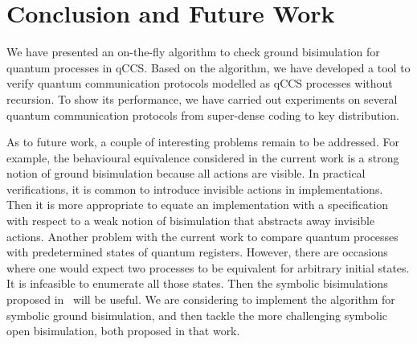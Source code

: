 \documentclass[a4paper,UKenglish,cleveref, autoref]{lipics-v2019}
\begin{document}
\section{Conclusion and Future Work}\label{sec:con}
We have presented an on-the-fly algorithm to check ground bisimulation for quantum processes in qCCS. Based on the algorithm, we have developed a tool to verify quantum communication protocols modelled as qCCS processes without recursion.  To show its performance, we have carried out experiments on several quantum communication protocols from super-dense coding to key distribution.

As to future work, a couple of interesting problems remain to be addressed.
For example, the behavioural equivalence considered in the current work is a strong notion of ground bisimulation because all actions are visible. In practical verifications, it is common to introduce invisible actions in implementations. Then it is more appropriate to equate an implementation with a specification with respect to a weak notion of bisimulation that abstracts away invisible actions. Another problem with the current work to compare quantum processes with predetermined states of quantum registers. However, there are occasions where one would expect two processes to be equivalent for arbitrary initial states. It is infeasible to enumerate all those states. Then the symbolic bisimulations proposed in~\cite{FDY14} will be useful. We are considering to implement the algorithm for symbolic ground bisimulation, and then tackle the more challenging symbolic open bisimulation, both proposed in that work.
 


%


\appendix
\end{document}
